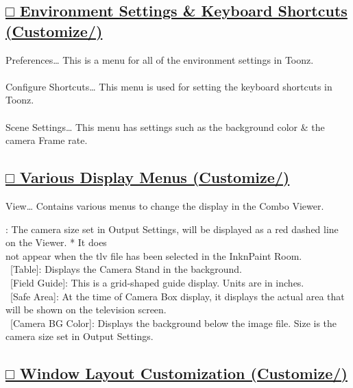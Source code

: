 \documentclass[a4paper,10pt]{article}
\begin{document}
\subsection*{\uline{□ Environment Settings \& Keyboard Shortcuts (Customize/)}}

\normalsize
\noindent Preferences… This is a menu for all of the environment settings in Toonz.\\
\\
Configure Shortcuts… This menu is used for setting the keyboard shortcuts in Toonz.\\
\\
Scene Settings… This menu has settings such as the background color \& the camera Frame rate.\\

\subsection*{\uline{□ Various Display Menus (Customize/)}}

\normalsize
\noindent View… Contains various menus to change the display in the Combo Viewer.\par
\footnotesize
{}: The camera size set in Output Settings, will be displayed as a red dashed line on the Viewer. * It does\\
not appear when the tlv file has been selected in the InknPaint Room.\\
\ [Table]: Displays the Camera Stand in the background.\\
\ [Field Guide]: This is a grid-shaped guide display. Units are in inches.\\
\ [Safe Area]: At the time of Camera Box display, it displays the actual area that will be shown on the television screen.\\
\ [Camera BG Color]: Displays the background below the image file. Size is the camera size set in Output Settings.\\

\subsection*{\uline{□ Window Layout Customization (Customize/)}}
\end{document}
